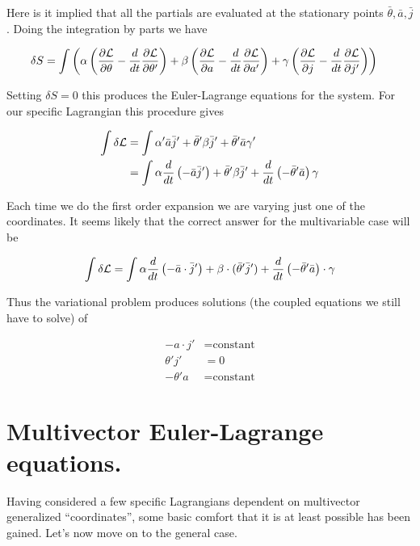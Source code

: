 Here is it implied that all the partials are evaluated at the stationary points $\bar{\theta}, \bar{a}, \bar{j}$.  Doing the integration by parts we have

\begin{align*}
\delta S
&=
\int \left( 
\alpha \left( \frac{\partial {\mathcal{L}}}{\partial {\theta}} - \frac{d}{dt} \frac{\partial {\mathcal{L}}}{\partial {\theta'}} \right) 
+\beta \left( \frac{\partial {\mathcal{L}}}{\partial {a}} - \frac{d}{dt} \frac{\partial {\mathcal{L}}}{\partial {a'}} \right) 
+\gamma \left( \frac{\partial {\mathcal{L}}}{\partial {j}} - \frac{d}{dt} \frac{\partial {\mathcal{L}}}{\partial {j'}} \right) 
\right)
\end{align*}

Setting $\delta S = 0$ this produces the Euler-Lagrange equations for the system.  For our specific Lagrangian this procedure gives

\begin{align*}
\int \delta \mathcal{L} 
&=
\int \alpha' \bar{a} \bar{j}' + \bar{\theta}' \beta \bar{j}' + \bar{\theta}' \bar{a} \gamma' \\
&=
\int \alpha \frac{d}{dt}\left( - \bar{a} \bar{j}' \right) + \bar{\theta}' \beta \bar{j}' + \frac{d}{dt}\left( -\bar{\theta}' \bar{a}\right) \gamma \\
\end{align*}

Each time we do the first order expansion we are varying just one of the coordinates.  It seems likely that the correct answer for the multivariable case will be

\begin{align*}
\int \delta \mathcal{L} 
&=
\int \alpha \frac{d}{dt}\left( - \bar{a} \cdot \bar{j}' \right) + \beta \cdot (\bar{\theta}' \bar{j}') + \frac{d}{dt}\left( -\bar{\theta}' \bar{a}\right) \cdot \gamma \\
\end{align*}

Thus the variational problem produces solutions (the coupled equations we still have to solve) of

\begin{align}\label{eqn:sPolarMultiPendulum:noo10}
- a \cdot j' &= \text{constant} \\
\theta' j' &= 0 \\
-\theta' a &= \text{constant}
\end{align}

\section{Multivector Euler-Lagrange equations.}

Having considered a few specific Lagrangians dependent on multivector generalized ``coordinates'', some basic comfort that it is at least possible has been gained.  Let's now move on to the general case.

